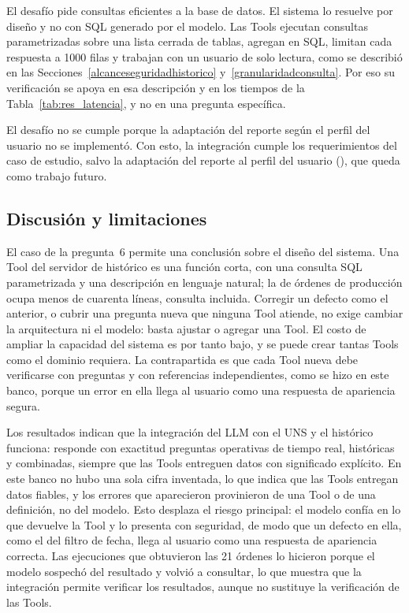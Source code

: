 El desafío  pide consultas eficientes a la base de datos. El sistema lo resuelve por diseño y no con SQL generado por el modelo. Las Tools ejecutan consultas parametrizadas sobre una lista cerrada de tablas, agregan en SQL, limitan cada respuesta a 1000 filas y trabajan con un usuario de solo lectura, como se describió en las Secciones~\ref{alcanceseguridadhistorico} y~\ref{granularidadconsulta}. Por eso su verificación se apoya en esa descripción y en los tiempos de la Tabla~\ref{tab:res_latencia}, y no en una pregunta específica.

El desafío  no se cumple porque la adaptación del reporte según el perfil del usuario no se implementó. Con esto, la integración cumple los requerimientos del caso de estudio, salvo la adaptación del reporte al perfil del usuario (), que queda como trabajo futuro.

\subsection{Discusión y limitaciones}
\label{discusionvalidacion}

El caso de la pregunta~6 permite una conclusión sobre el diseño del sistema. Una Tool del servidor de histórico es una función corta, con una consulta SQL parametrizada y una descripción en lenguaje natural; la de órdenes de producción ocupa menos de cuarenta líneas, consulta incluida. Corregir un defecto como el anterior, o cubrir una pregunta nueva que ninguna Tool atiende, no exige cambiar la arquitectura ni el modelo: basta ajustar o agregar una Tool. El costo de ampliar la capacidad del sistema es por tanto bajo, y se puede crear tantas Tools como el dominio requiera. La contrapartida es que cada Tool nueva debe verificarse con preguntas y con referencias independientes, como se hizo en este banco, porque un error en ella llega al usuario como una respuesta de apariencia segura.

Los resultados indican que la integración del LLM con el UNS y el histórico funciona: responde con exactitud preguntas operativas de tiempo real, históricas y combinadas, siempre que las Tools entreguen datos con significado explícito. En este banco no hubo una sola cifra inventada, lo que indica que las Tools entregan datos fiables, y los errores que aparecieron provinieron de una Tool o de una definición, no del modelo. Esto desplaza el riesgo principal: el modelo confía en lo que devuelve la Tool y lo presenta con seguridad, de modo que un defecto en ella, como el del filtro de fecha, llega al usuario como una respuesta de apariencia correcta. Las ejecuciones que obtuvieron las 21 órdenes lo hicieron porque el modelo sospechó del resultado y volvió a consultar, lo que muestra que la integración permite verificar los resultados, aunque no sustituye la verificación de las Tools.


